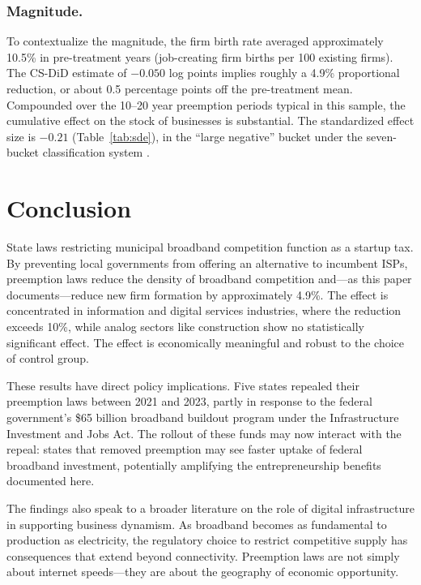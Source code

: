 \documentclass[12pt]{article}
\begin{document}


\subsubsection*{Magnitude.} To contextualize the magnitude, the firm birth rate averaged approximately 10.5\% in pre-treatment years (job-creating firm births per 100 existing firms). The CS-DiD estimate of $-0.050$ log points implies roughly a 4.9\% proportional reduction, or about 0.5 percentage points off the pre-treatment mean. Compounded over the 10--20 year preemption periods typical in this sample, the cumulative effect on the stock of businesses is substantial. The standardized effect size is $-0.21$ (Table~\ref{tab:sde}), in the ``large negative'' bucket under the seven-bucket classification system \citep{apep_oracle}.


\section{Conclusion}\label{sec:conclusion}

State laws restricting municipal broadband competition function as a startup tax. By preventing local governments from offering an alternative to incumbent ISPs, preemption laws reduce the density of broadband competition and---as this paper documents---reduce new firm formation by approximately 4.9\%. The effect is concentrated in information and digital services industries, where the reduction exceeds 10\%, while analog sectors like construction show no statistically significant effect. The effect is economically meaningful and robust to the choice of control group.

These results have direct policy implications. Five states repealed their preemption laws between 2021 and 2023, partly in response to the federal government's \$65 billion broadband buildout program under the Infrastructure Investment and Jobs Act. The rollout of these funds may now interact with the repeal: states that removed preemption may see faster uptake of federal broadband investment, potentially amplifying the entrepreneurship benefits documented here.

The findings also speak to a broader literature on the role of digital infrastructure in supporting business dynamism. As broadband becomes as fundamental to production as electricity, the regulatory choice to restrict competitive supply has consequences that extend beyond connectivity. Preemption laws are not simply about internet speeds---they are about the geography of economic opportunity.
\end{document}
